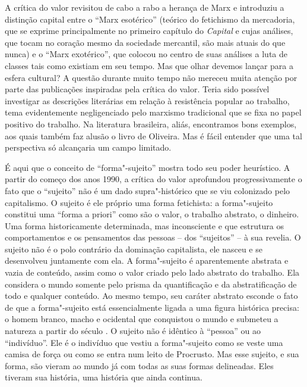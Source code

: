 A crítica do valor revisitou de cabo a rabo a herança de Marx e
introduziu a distinção capital entre o ``Marx esotérico'' (teórico do
fetichismo da mercadoria, que se exprime principalmente no primeiro
capítulo do \emph{Capital} e cujas análises, que tocam no coração mesmo
da sociedade mercantil, são mais atuais do que nunca) e o ``Marx
exotérico'', que colocou no centro de suas análises a luta de classes
tais como existiam em seu tempo. Mas que olhar devemos lançar para a
esfera cultural? A questão durante muito tempo não mereceu muita atenção
por parte das publicações inspiradas pela crítica do valor. Teria sido
possível investigar as descrições literárias em relação à resistência
popular ao trabalho, tema evidentemente negligenciado pelo marxismo
tradicional que se fixa no papel positivo do trabalho. Na literatura
brasileira, aliás, encontramos bons exemplos, aos quais também faz
alusão o livro de Oliveira. Mas é fácil entender que uma tal perspectiva
só alcançaria um campo limitado.

É aqui que o conceito de ``forma"-sujeito'' mostra todo seu poder
heurístico. A partir do começo dos anos 1990, a crítica do valor
aprofundou progressivamente o fato que o ``sujeito'' não é um dado
supra"-histórico que se viu colonizado pelo capitalismo. O sujeito é ele
próprio uma forma fetichista: a forma"-sujeito constitui uma ``forma a
priori'' como são o valor, o trabalho abstrato, o dinheiro. Uma forma
historicamente determinada, mas inconsciente e que estrutura os
comportamentos e os pensamentos das pessoas -- dos ``sujeitos'' -- à sua
revelia. O sujeito não é o polo contrário da dominação capitalista, ele
nasceu e se desenvolveu juntamente com ela. A forma"-sujeito é
aparentemente abstrata e vazia de conteúdo, assim como o valor criado pelo
lado abstrato do trabalho. Ela considera o mundo somente pelo prisma da
quantificação e da abstratificação de todo e qualquer conteúdo. Ao mesmo
tempo, seu caráter abstrato esconde o fato de que a forma"-sujeito está
essencialmente ligada a uma figura histórica precisa: o homem branco,
macho e ocidental que conquistou o mundo e submeteu a natureza a partir
do século . O sujeito não é idêntico à ``pessoa'' ou ao ``indivíduo''.
Ele é o indivíduo que vestiu a forma"-sujeito como se veste uma camisa de
força ou como se entra num leito de Procrusto. Mas esse sujeito, e sua
forma, são vieram ao mundo já com todas as suas formas delineadas. Eles
tiveram sua história, uma história que ainda continua.

